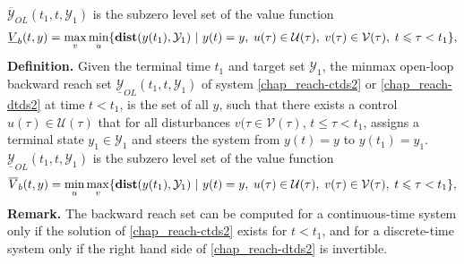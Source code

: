 \documentclass[letterpaper,10pt,english]{sphinxmanual}
\begin{document}
$\overline{{\mathcal Y}}_{OL}(t_1, t, {\mathcal Y}_1)$ is the
subzero level set of the value function
\label{chap_reach:equation-maxminvfb}\begin{gather}
\begin{split}\begin{aligned}
\underline{V}_b(t, y) = \max_v\min_u\{{\bf dist}(y(t_1), {\mathcal Y}_1) ~|~ y(t)=y, \; u(\tau)\in{\mathcal U}(\tau), \;
v(\tau)\in{\mathcal V}(\tau), \; t\leqslant\tau<t_1\},
\end{aligned}\end{split}\label{chap_reach-maxminvfb}
\end{gather}
\textbf{Definition.} Given the terminal time $t_1$ and target set
${\mathcal Y}_1$, the minmax open-loop backward reach set
$\underline{{\mathcal Y}}_{OL}(t_1, t, {\mathcal Y}_1)$ of system
\eqref{chap_reach-ctds2} or \eqref{chap_reach-dtds2} at time $t<t_1$, is the set of all $y$,
such that there exists a control $u(\tau)\in{\mathcal U}(\tau)$
that for all disturbances $v(\tau\in{\mathcal V}(\tau)$,
$t\leqslant\tau<t_1$, assigns a terminal state
$y_1\in{\mathcal Y}_1$ and steers the system from $y(t)=y$
to $y(t_1)=y_1$.
$\underline{{\mathcal Y}}_{OL}(t_1, t, {\mathcal Y}_1)$ is the
subzero level set of the value function
\label{chap_reach:equation-minmaxvfb}\begin{gather}
\begin{split}\begin{aligned}
\overline{V}_b(t, y) = \min_u\max_v\{{\bf dist}(y(t_1), {\mathcal Y}_1) ~|~ y(t)=y, \; u(\tau)\in{\mathcal U}(\tau), \;
v(\tau)\in{\mathcal V}(\tau), \; t\leqslant\tau<t_1\},
\end{aligned}\end{split}\label{chap_reach-minmaxvfb}
\end{gather}
\textbf{Remark.} The backward reach set can be computed for a continuous-time
system only if the solution of \eqref{chap_reach-ctds2} exists for $t<t_1$, and
for a discrete-time system only if the right hand side of \eqref{chap_reach-dtds2} is
invertible.
\end{document}
